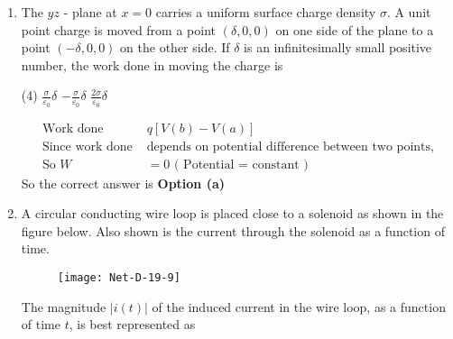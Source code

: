 \begin{enumerate}
 \begin{tasks}(4)
	\task[\textbf{a.}]$C_{1} C_{2} C_{3}$
	\task[\textbf{b.}]$C_{2} \bar{C}_{3}+\bar{C}_{1}$
	\task[\textbf{c.}]$C_{1} \bar{C}_{2}+C_{3}$
	\task[\textbf{d.}] $C_{2} \bar{C}_{3}+C_{2}$	
\end{tasks}
\begin{figure}[H]
	\centering
	\texttt{[image: Net-D-19-8]}
\end{figure}
\begin{answer}
	\begin{align*}
	\text { Least significant bit is }(0,1) \text { i.e. } C_{1} \text { will be selected and } C_{2}&=0, C_{3}=0\\
	\text { So output }=C_{1} \bar{C}_{2}+C_{3}=C_{1} \cdot \overline{0}+0&=C_{1}
	\end{align*}
		So the correct answer is \textbf{Option (c)}
\end{answer}
\item The $y z$ - plane at $x=0$ carries a uniform surface charge density $\sigma$. A unit point charge is moved from a point $(\delta, 0,0)$ on one side of the plane to a point $(-\delta, 0,0)$ on the other side. If $\delta$ is an infinitesimally small positive number, the work done in moving the charge is
 \begin{tasks}(4)
	\task[\textbf{b.}]$\frac{\sigma}{\varepsilon_{0}} \delta$
	\task[\textbf{c.}]$-\frac{\sigma}{\varepsilon_{0}} \delta$
	\task[\textbf{d.}]$\frac{2 \sigma}{\varepsilon_{0}} \delta$ 
\end{tasks}
\begin{answer}
	\begin{align*}
	\text { Work done }& q[V(b)-V(a)]\\
	\text { Since work done }&\text{depends on potential difference between two points, }\\
\text{	So }W&=0
\text{	( Potential = constant )}
	\end{align*}
	So the correct answer is \textbf{Option (a)}
\end{answer}
\item A circular conducting wire loop is placed close to a solenoid as shown in the figure below. Also shown is the current through the solenoid as a function of time.	
\begin{figure}[H]
	\centering
	\texttt{[image: Net-D-19-9]}
\end{figure}
The magnitude $|i(t)|$ of the induced current in the wire loop, as a function of time $t$, is best represented as

\end{enumerate}
